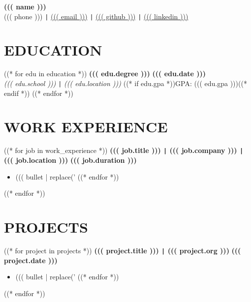 \documentclass[10pt]{article}
\begin{document}
\begin{center}
    \textbf{\fontsize{18}{18}\selectfont ((( name )))} \\
    ((( phone ))) \texttt{|} \href{mailto:((( email )))}{((( email )))} \texttt{|}
    \href{((( github )))}{((( github )))} \texttt{|}  
    \href{((( linkedin )))}{((( linkedin )))}
\end{center}

\vspace{-0.7cm}
\section*{EDUCATION} 
\vspace{-0.2cm} 
((* for edu in education *))
\noindent 
\textbf{((( edu.degree )))} \hfill \textbf{((( edu.date )))} \\
\textit{((( edu.school )))} \texttt{|} \textit{((( edu.location )))} ((* if edu.gpa *))\hfill GPA: ((( edu.gpa )))((* endif *))
((* endfor *))


\vspace{-0.4cm}
\section*{WORK EXPERIENCE}
((* for job in work_experience *))
\vspace{-0.2cm}
\noindent
\textbf{((( job.title ))) \texttt{|} ((( job.company ))) \texttt{|} ((( job.location )))} \hfill \textbf{((( job.duration )))} 
\vspace{-0.15cm}
\begin{itemize}[leftmargin=0.5cm, itemsep=0pt]
((* for bullet in job.bullets *))
    \item ((( bullet | replace('%
((* endfor *))
\end{itemize}
((* endfor *))

\vspace{-0.75cm}
\section*{PROJECTS}
\vspace{-0.1cm}
((* for project in projects *))
\noindent
\textbf{((( project.title ))) \texttt{|} ((( project.org )))} \hfill \textbf{((( project.date )))} \\
\vspace{-0.4cm}
\begin{itemize}[leftmargin=0.6cm, itemsep=-0.1cm, topsep=0cm]
((* for bullet in project.bullets *))
    \item ((( bullet | replace('%
((* endfor *))
\end{itemize}
((* endfor *))
\end{document}

